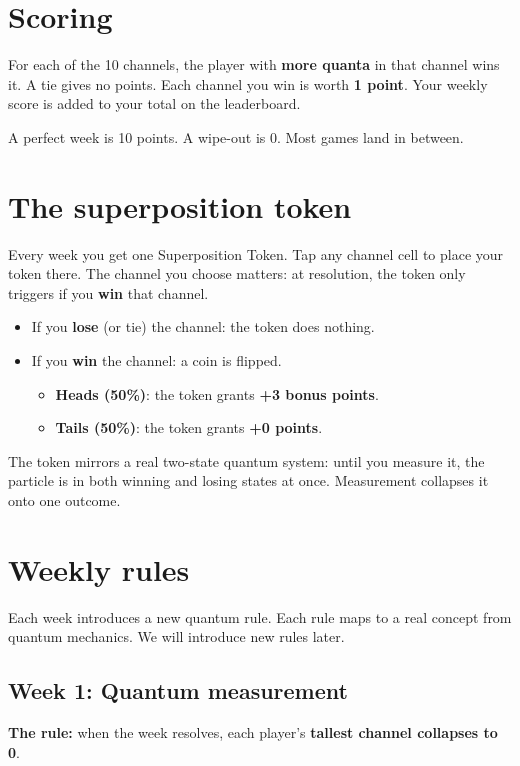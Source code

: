 \documentclass[11pt]{article}
\begin{document}
\section{Scoring}

For each of the 10 channels, the player with \textbf{more quanta} in that
channel wins it. A tie gives no points. Each channel you win is worth
\textbf{1 point}. Your weekly score is added to your total on the leaderboard.

A perfect week is 10 points. A wipe-out is 0. Most games land in between.

\section{The superposition token}

Every week you get one Superposition Token. Tap any channel cell to place
your token there. The channel you choose matters: at resolution, the token
only triggers if you \textbf{win} that channel.

\begin{itemize}[leftmargin=1.5em]
    \item If you \textbf{lose} (or tie) the channel: the token does nothing.
    \item If you \textbf{win} the channel: a coin is flipped.
    \begin{itemize}
        \item \textbf{Heads (50\%)}: the token grants \textbf{+3 bonus points}.
        \item \textbf{Tails (50\%)}: the token grants \textbf{+0 points}.
    \end{itemize}
\end{itemize}

The token mirrors a real two-state quantum system: until you measure it, the
particle is in both winning and losing states at once. Measurement collapses
it onto one outcome.

\section{Weekly rules}

Each week introduces a new quantum rule. Each rule maps to a real concept
from quantum mechanics. We will introduce new rules later.

\subsection*{Week 1: Quantum measurement}
\textbf{The rule:} when the week resolves, each player's \textbf{tallest
channel collapses to 0}.
\end{document}

